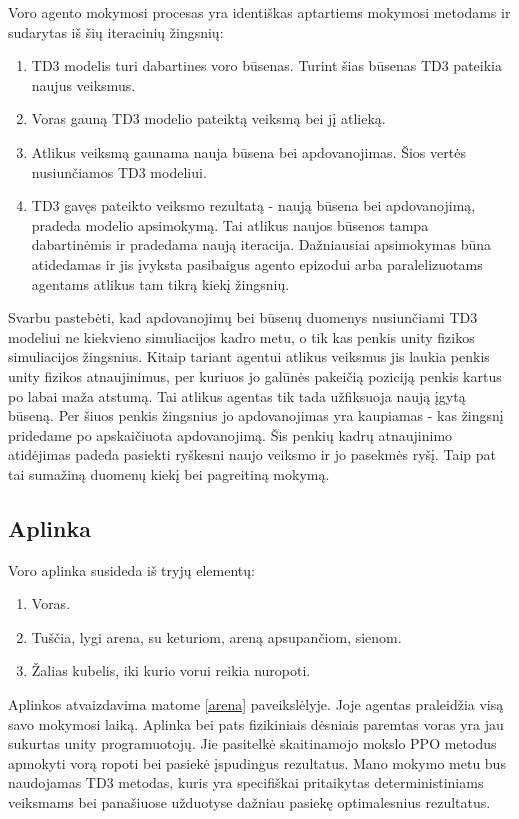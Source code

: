 \documentclass[a4paper, 12pt]{article}
\begin{document}
Voro agento mokymosi procesas yra identiškas aptartiems mokymosi metodams ir sudarytas iš šių iteracinių žingsnių:

\begin{enumerate}
  \addtolength{\itemsep}{-0.5\baselineskip} 
  \item TD3 modelis turi dabartines voro būsenas. Turint šias būsenas TD3 pateikia naujus veiksmus.
  \item Voras gauną TD3 modelio pateiktą veiksmą bei jį atlieką.
  \item Atlikus veiksmą gaunama nauja būsena bei apdovanojimas. Šios vertės nusiunčiamos TD3 modeliui. 
  \item TD3 gavęs pateikto veiksmo rezultatą - naują būsena bei apdovanojimą, pradeda modelio apsimokymą. Tai atlikus naujos būsenos tampa dabartinėmis ir pradedama naują iteracija. Dažniausiai apsimokymas būna atidedamas ir jis įvyksta pasibaigus agento epizodui arba paralelizuotams agentams atlikus tam tikrą kiekį žingsnių.
\end{enumerate}


Svarbu pastebėti, kad apdovanojimų bei būsenų duomenys nusiunčiami TD3 modeliui ne kiekvieno simuliacijos kadro metu, o tik kas penkis unity fizikos simuliacijos žingsnius. Kitaip tariant agentui atlikus veiksmus jis laukia penkis unity fizikos atnaujinimus, per kuriuos jo galūnės pakeičią poziciją penkis kartus po labai maža atstumą. Tai atlikus agentas tik tada užfiksuoja naują įgytą būseną. Per šiuos penkis žingsnius jo apdovanojimas yra kaupiamas - kas žingsnį pridedame po apskaičiuota apdovanojimą. Šis penkių kadrų atnaujinimo atidėjimas padeda pasiekti ryškesni naujo veiksmo ir jo pasekmės ryšį. Taip pat tai sumažiną duomenų kiekį bei pagreitiną mokymą.

\subsection{Aplinka}

Voro aplinka susideda iš tryjų elementų:

\begin{enumerate}
  \addtolength{\itemsep}{-0.5\baselineskip} 
  \item Voras.
  \item Tuščia, lygi arena, su keturiom, areną apsupančiom, sienom.
  \item Žalias kubelis, iki kurio vorui reikia nuropoti.
\end{enumerate}

Aplinkos atvaizdavima matome \ref{arena} paveikslėlyje. Joje agentas praleidžia visą savo mokymosi laiką. Aplinka bei pats fizikiniais dėsniais paremtas voras yra jau sukurtas unity programuotojų. Jie pasitelkė skaitinamojo mokslo PPO metodus apmokyti vorą ropoti bei pasiekė įspudingus rezultatus. Mano mokymo metu bus naudojamas TD3 metodas, kuris yra specifiškai pritaikytas deterministiniams veiksmams bei panašiuose užduotyse dažniau pasiekę optimalesnius rezultatus. 
\end{document}
